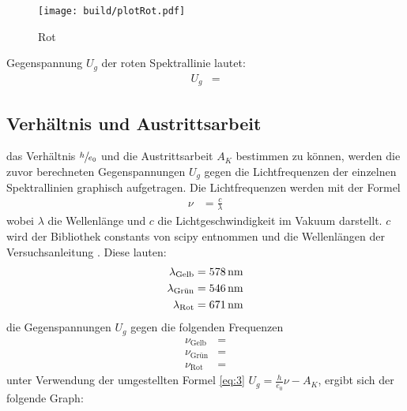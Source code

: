    \begin{figure}[H]
        \centering
        \texttt{[image: build/plotRot.pdf]}
        \caption{Rot}
        \label{fig:9}
    \end{figure}

    \justifying Gegenspannung $U_g$ der roten Spektrallinie lautet:
    \begin{align}
    U_g &=\text{} \label{eq:14}
    \end{align}

\subsection{Verhältnis und Austrittsarbeit}


    \justifying das Verhältnis $\sfrac{h}{e_0}$ und die Austrittsarbeit $A_K$ bestimmen zu können, werden die zuvor berechneten Gegenspannungen $U_g$
    gegen die Lichtfrequenzen der einzelnen Spektrallinien graphisch aufgetragen. Die Lichtfrequenzen werden mit der Formel
    \begin{align}
    \nu &= \frac{c}{\lambda} \label{eq:15}
    \end{align}
    \justifying wobei $\lambda$ die Wellenlänge und $c$ die Lichtgeschwindigkeit im Vakuum darstellt. $c$ wird der Bibliothek constants
    von scipy \cite{scipy} entnommen und die Wellenlängen der Versuchsanleitung \cite{V500}. Diese lauten:
    \begin{subequations} \label{eq:16}
    \begin{align}
    \lambda_{\text{Gelb}} &= \text{\SI{578}{\nano\meter}} \label{eq:16a}\\
    \lambda_{\text{Grün}} &= \text{\SI{546}{\nano\meter}} \label{eq:16b}\\
    \lambda_{\text{Rot}} &= \text{\SI{671}{\nano\meter}} \label{eq:16c}
    \end{align}
    \end{subequations}
    \justifying die Gegenspannungen $U_g$ gegen die folgenden Frequenzen
    \begin{align}
    \nu_{\text{Gelb}} &= \text{}\\
    \nu_{\text{Grün}} &= \text{}\\
    \nu_{\text{Rot}} &= \text{}
    \end{align}
    \justifying unter Verwendung der umgestellten Formel \eqref{eq:3} $U_g = \frac{h}{e_0}\nu - A_K$, ergibt sich der folgende Graph:

